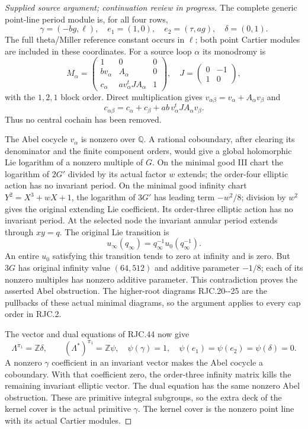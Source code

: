 \begin{proof}[Supplied source argument; continuation review in progress]
The complete generic point-line period module is, for all four
rows,
\[
 \gamma=(-bg,\ell),\quad e_1=(1,0),\quad
 e_2=(\tau,ag),\quad\delta=(0,1).
 \tag{RJC.43}
\]
The full theta/Miller reference constant occurs in \(\ell\);
both point Cartier modules are included in these coordinates.
For a source loop \(\alpha\) its monodromy is
\[
 M_\alpha=
 \begin{pmatrix}
 1&0&0\\
 b v_\alpha&A_\alpha&0\\
 c_\alpha&a v_\alpha^t J A_\alpha&1
 \end{pmatrix},\quad
 J=\begin{pmatrix}0&-1\\1&0\end{pmatrix},
 \tag{RJC.44}
\]
with the \(1,2,1\) block order. Direct multiplication gives
\(v_{\alpha\beta}=v_\alpha+A_\alpha v_\beta\) and
\[
 c_{\alpha\beta}=c_\alpha+c_\beta+
 ab\,v_\alpha^tJ A_\alpha v_\beta.
 \tag{RJC.45}
\]
Thus no central cochain has been removed.

The Abel cocycle \(v_\alpha\) is nonzero over \(\mathbb Q\).
A rational coboundary, after clearing its denominator and the
finite component orders, would give a global holomorphic Lie
logarithm of a nonzero multiple of \(G\). On the minimal good
III chart the logarithm of \(2G'\) divided by its actual
factor \(w\) extends; the order-four elliptic action has no
invariant period. On the minimal good infinity chart
\(Y^2=X^3+wX+1\), the logarithm of \(3G'\) has leading term
\(-w^2/8\); division by \(w^2\) gives the original extending
Lie coefficient. Its order-three elliptic action has no
invariant period. At the selected node the invariant annular
period extends through \(xy=q\).
The original Lie transition is
\[
 u_\infty(q_\infty)
 =q_\infty^{-1}u_0(q_\infty^{-1}).
 \tag{RJC.46}
\]
An entire \(u_0\) satisfying this transition tends to zero
at infinity and is zero. But \(3G\) has original infinity
value \((64,512)\) and additive parameter \(-1/8\);
each of its nonzero multiples has nonzero additive parameter.
This contradiction proves the asserted Abel obstruction.
The higher-root diagrams RJC.20-\/-25 are the pullbacks of
these actual minimal diagrams, so the argument applies to
every cap order in RJC.2.

The vector and dual equations of RJC.44 now give
\[
 \Lambda^{\pi_1}=\mathbb Z\delta,\qquad
 (\Lambda^*)^{\pi_1}=\mathbb Z\psi,\quad
 \psi(\gamma)=1,\quad\psi(e_1)=\psi(e_2)=\psi(\delta)=0.
 \tag{RJC.47}
\]
A nonzero \(\gamma\) coefficient in an invariant vector makes
the Abel cocycle a coboundary. With that coefficient zero,
the order-three infinity matrix kills the remaining invariant
elliptic vector. The dual equation has the same nonzero Abel
obstruction. These are primitive integral subgroups, so the
extra deck of the kernel cover is the actual primitive
\(\gamma\). The kernel cover is the nonzero point line
with its actual Cartier modules.


\end{proof}
